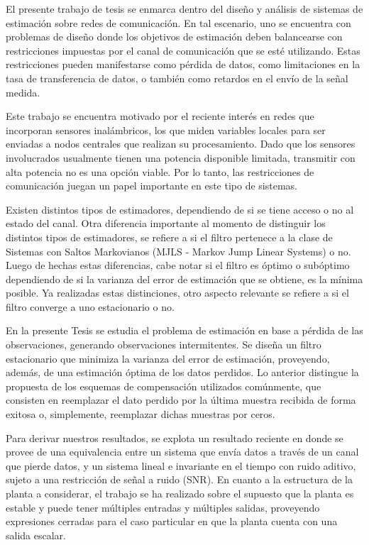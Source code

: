 El presente trabajo de tesis se enmarca dentro del dise\~no y an\'alisis de sistemas de estimaci\'on sobre redes de comunicaci\'on. En tal escenario, uno se encuentra con problemas de dise\~no donde los objetivos de estimaci\'on deben balancearse con restricciones impuestas por el canal de comunicaci\'on que se est\'e utilizando. 
Estas restricciones pueden manifestarse como p\'erdida de datos, como limitaciones en la tasa de transferencia de datos, o tambi\'en como retardos en el env\'io de la se\~nal medida.

Este trabajo se encuentra motivado por el reciente inter\'es en redes que incorporan sensores inal\'ambricos, los que miden variables locales para ser enviadas a nodos centrales que realizan su procesamiento. Dado que los sensores involucrados usualmente tienen una potencia disponible limitada, transmitir con alta potencia no es una opci\'on viable. Por lo tanto, las restricciones de comunicaci\'on juegan un papel importante en este tipo de sistemas.

Existen distintos tipos de estimadores, dependiendo de si se tiene acceso o no al estado del canal. Otra diferencia importante al momento de distinguir los distintos tipos de estimadores, se refiere a si el filtro pertenece a la clase de Sistemas con Saltos Markovianos (MJLS - Markov Jump Linear Systems) o no. Luego de hechas estas diferencias, cabe notar si el filtro es \'optimo o sub\'optimo dependiendo de si la varianza del error de estimaci\'on que se obtiene, es la m\'inima posible. Ya realizadas estas distinciones, otro aspecto relevante se refiere a si el filtro converge a uno estacionario o no.

En la presente Tesis se estudia el problema de estimaci\'on en base a pérdida de las observaciones, generando observaciones intermitentes. Se dise\~na un filtro estacionario que minimiza la varianza del error de estimaci\'on, proveyendo, adem\'as, de una estimaci\'on \'optima de los datos perdidos. Lo anterior distingue la propuesta de los esquemas de compensaci\'on utilizados com\'unmente, que consisten en reemplazar el dato perdido por la \'ultima muestra recibida de forma exitosa o, simplemente, reemplazar dichas muestras por ceros.

Para derivar nuestros resultados, se explota un resultado reciente en donde se provee de una equivalencia entre un sistema que env\'ia datos a trav\'es de un canal que pierde datos, y un sistema lineal e invariante en el tiempo con ruido aditivo, sujeto a una restricci\'on de se\~nal a ruido (SNR). En cuanto a la estructura de la planta a considerar, el trabajo se ha realizado sobre el supuesto que la planta es estable y puede tener m\'ultiples entradas y m\'ultiples salidas, proveyendo expresiones cerradas para el caso particular en que la planta cuenta con una salida escalar. 

